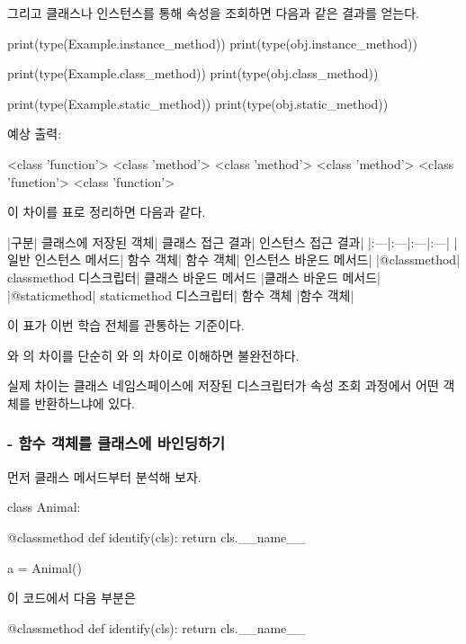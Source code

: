 그리고 클래스나 인스턴스를 통해 속성을 조회하면 다음과 같은 결과를 얻는다.

\begin{dhkcode}
print(type(Example.instance_method))
print(type(obj.instance_method))

print(type(Example.class_method))
print(type(obj.class_method))

print(type(Example.static_method))
print(type(obj.static_method))
\end{dhkcode}

예상 출력:

\begin{dhkzsh}
<class 'function'>
<class 'method'>
<class 'method'>
<class 'method'>
<class 'function'>
<class 'function'>
\end{dhkzsh}

이 차이를 표로 정리하면 다음과 같다.

\begin{dhktable}
|구분|	클래스에 저장된 객체|	클래스 접근 결과|	인스턴스 접근 결과|
|:---|:---|:---|:---|
|일반 인스턴스 메서드|	함수 객체|	함수 객체|	인스턴스 바운드 메서드|
|@classmethod|	classmethod 디스크립터|	클래스 바운드 메서드	|클래스 바운드 메서드|
|@staticmethod|	staticmethod 디스크립터|	함수 객체	|함수 객체|
\end{dhktable}

이 표가 이번 학습 전체를 관통하는 기준이다.

와 의 차이를 단순히 와 의 차이로 이해하면 불완전하다.

실제 차이는 클래스 네임스페이스에 저장된 디스크립터가 속성 조회 과정에서 어떤 객체를 반환하느냐에 있다.

\subsubsection{ - 함수 객체를 클래스에 바인딩하기}

먼저 클래스 메서드부터 분석해 보자.

\begin{dhkcode}
class Animal:

    @classmethod
    def identify(cls):
        return cls.__name__


a = Animal()
\end{dhkcode}

이 코드에서 다음 부분은

\begin{dhkcode}
@classmethod
def identify(cls):
    return cls.__name__
\end{dhkcode}

